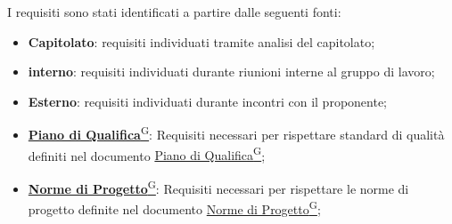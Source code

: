 I requisiti sono stati identificati a partire dalle seguenti fonti:
\begin{itemize}
    \item \textbf{Capitolato}: requisiti individuati tramite analisi del capitolato;
    \item \textbf{interno}: requisiti individuati durante riunioni interne al gruppo di lavoro;
    \item \textbf{Esterno}: requisiti individuati durante incontri con il proponente;
    \item \href{https://code7crusaders.github.io/docs/RTB/documentazione_interna/glossario.html#piano-di-qualifica}{\textbf{Piano di Qualifica}\textsuperscript{G}}: Requisiti necessari per rispettare standard di qualità definiti nel documento \href{https://code7crusaders.github.io/docs/RTB/documentazione_interna/glossario.html#piano-di-qualifica}{Piano di Qualifica\textsuperscript{G}};
    \item \href{https://code7crusaders.github.io/docs/RTB/documentazione_interna/glossario.html#norme-di-progetto}{\textbf{Norme di Progetto}\textsuperscript{G}}: Requisiti necessari per rispettare le norme di progetto definite nel documento \href{https://code7crusaders.github.io/docs/RTB/documentazione_interna/glossario.html#norme-di-progetto}{Norme di Progetto\textsuperscript{G}};
\end{itemize}

